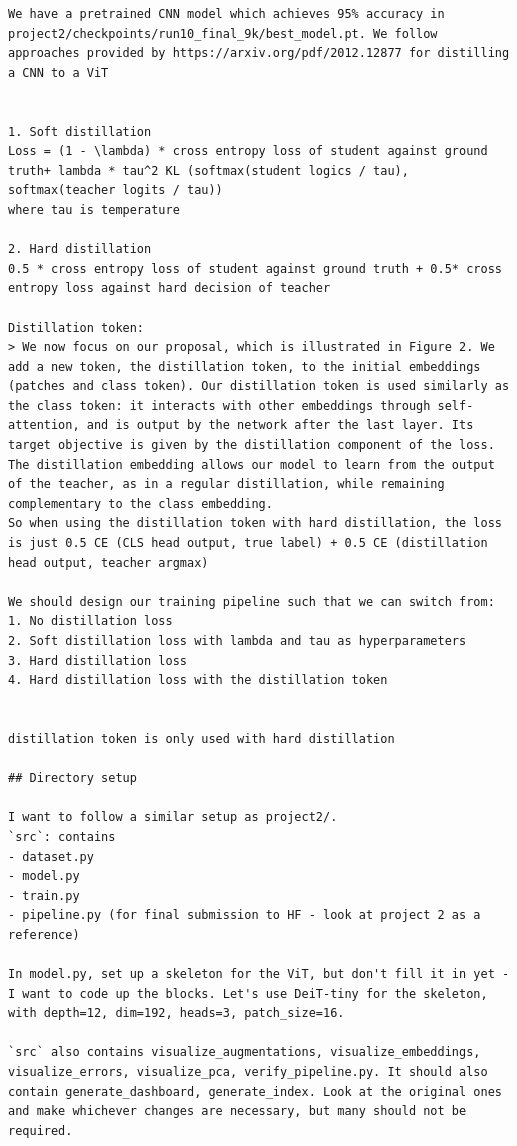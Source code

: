 \documentclass[11pt]{article}
\begin{document}
\begin{enumerate}
\begin{verbatim}
We have a pretrained CNN model which achieves 95% accuracy in project2/checkpoints/run10_final_9k/best_model.pt. We follow approaches provided by https://arxiv.org/pdf/2012.12877 for distilling a CNN to a ViT


1. Soft distillation
Loss = (1 - \lambda) * cross entropy loss of student against ground truth+ lambda * tau^2 KL (softmax(student logics / tau), softmax(teacher logits / tau))    
where tau is temperature

2. Hard distillation
0.5 * cross entropy loss of student against ground truth + 0.5* cross entropy loss against hard decision of teacher 

Distillation token:
> We now focus on our proposal, which is illustrated in Figure 2. We add a new token, the distillation token, to the initial embeddings (patches and class token). Our distillation token is used similarly as the class token: it interacts with other embeddings through self-attention, and is output by the network after the last layer. Its target objective is given by the distillation component of the loss. The distillation embedding allows our model to learn from the output of the teacher, as in a regular distillation, while remaining complementary to the class embedding.
So when using the distillation token with hard distillation, the loss is just 0.5 CE (CLS head output, true label) + 0.5 CE (distillation head output, teacher argmax)

We should design our training pipeline such that we can switch from:
1. No distillation loss
2. Soft distillation loss with lambda and tau as hyperparameters
3. Hard distillation loss 
4. Hard distillation loss with the distillation token


distillation token is only used with hard distillation

## Directory setup

I want to follow a similar setup as project2/.
`src`: contains
- dataset.py
- model.py
- train.py
- pipeline.py (for final submission to HF - look at project 2 as a reference)

In model.py, set up a skeleton for the ViT, but don't fill it in yet - I want to code up the blocks. Let's use DeiT-tiny for the skeleton, with depth=12, dim=192, heads=3, patch_size=16.

`src` also contains visualize_augmentations, visualize_embeddings, visualize_errors, visualize_pca, verify_pipeline.py. It should also contain generate_dashboard, generate_index. Look at the original ones and make whichever changes are necessary, but many should not be required.


\end{verbatim}
\end{enumerate}
\end{document}
